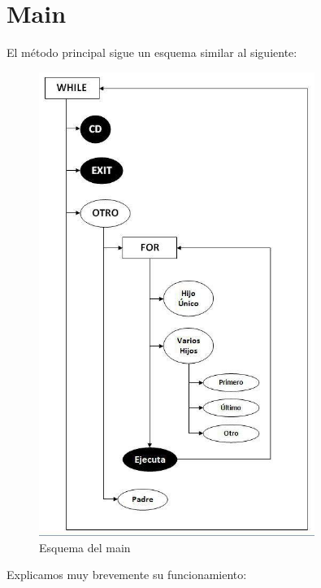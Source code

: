 \section{Main}
El método principal sigue un esquema similar al siguiente:
\begin{figure}[]
\begin{center}
 \centering
 \includegraphics[width=0.8\textwidth]{./esquema}
 \caption{Esquema del main}
 \label{fig:Esquema del main}
\end{center}
\end{figure}
Explicamos muy brevemente su funcionamiento:
\newpage 
